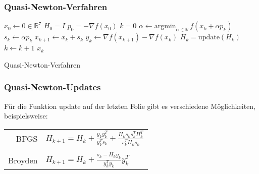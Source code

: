 \documentclass[xcolor = dvipsnames, notheorems, 10pt]{beamer}
\theoremstyle{definition}
\begin{document}
\begin{frame}
\frametitle{Quasi-Newton-Verfahren}
	\begin{algorithm}[H]
		\begin{algorithmic}[1]
			\STATE $x_0 \gets 0 \in \mathbb{R}^7$
			\STATE $H_0 = I$
			\STATE $p_0 = -\nabla f(x_0)$
			\STATE $k = 0$
				\STATE $\alpha \gets \text{argmin}_{\alpha \in \mathbb{R}}\, f(x_k + \alpha p_k)$
				\STATE $s_k \gets \alpha p_k$
				\STATE $x_{k+1} \gets x_k+s_k$
				\STATE $y_k \gets \nabla f(x_{k+1}) - \nabla f(x_k)$
				\STATE $H_k = \text{update}(H_k)$
				\STATE $k \gets k+1$
			\ENDWHILE
			\RETURN $x_k$
		\end{algorithmic}
		\caption{Quasi-Newton-Verfahren}
	\end{algorithm}
\end{frame}
\begin{frame}
\frametitle{Quasi-Newton-Updates}
	Für die Funktion update auf der letzten Folie gibt es verschiedene Möglichkeiten, beispielsweise:
	\begin{center}
		\begin{tabular}{r|l}
			BFGS 		&	$H_{k+1} = H_k + \frac{y_k y_k^T}{y_k^T s_k} + \frac{H_k s_k s_k^T H_k^T}{s_k^T H_k s_k}$\\
			& \\
			Broyden 	&	$H_{k+1} = H_k + \frac{s_k - H_k y_k}{y_k^T y_k} y_k^T$
		\end{tabular}
	\end{center}
\end{frame}
\end{document}
